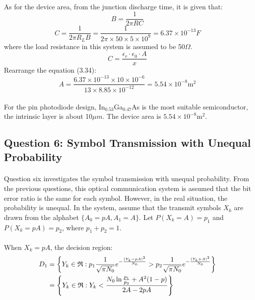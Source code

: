 \documentclass[12pt]{article}
\begin{document}
    \paragraph{}
    As for the device area, from the junction discharge time, it is given that:
    \begin{equation}
         B = \frac{1}{2 \pi R C}
    \end{equation}
    \begin{equation}
         C = \frac{1}{2 \pi R_L B}=\frac{1}{2\pi \times 50 \times 5 \times 10^9} = 6.37 \times10^{-13}F
    \end{equation}
    where the load resistance in this system is assumed to be 50$\Omega$.
    \begin{equation}
        C = \frac{\epsilon_r\cdot \epsilon_0 \cdot A}{x}
    \end{equation}
    Rearrange the equation (3.34):
    \begin{equation}
        A =  \frac{6.37 \times 10^{-13} \times 10 \times 10^{-6}}{13 \times 8.85 \times 10 ^ {-12}} = 5.54 \times 10^{-8}\mbox{m}^2
    \end{equation}
    \paragraph{}
    For the pin photodiode design, In$_{0.53}$Ga$_{0.47}$As is the most suitable semiconductor, the intrinsic layer is about 10$\mu m$. The device area is $5.54 \times 10^{-8}\mbox{m}^2$.
    
    
    
    \subsection{Question 6: Symbol Transmission with Unequal Probability}
    \paragraph{}
    Question six investigates the symbol transmission with unequal probability. From the previous questions, this optical communication system is assumed that the bit error ratio is the same for each symbol. However, in the real situation, the probability is unequal. In the system, assume that the transmit symbols $X_k$ are drawn from the alphabet $\{ A_0 = pA, A_1 = A \}$. Let $P(X_k = A) = p_1$ and $P(X_k = pA) = p_2$, where $p_1+p_2=1$.
    \paragraph{}
    When $X_k = pA$, the decision region:
    \begin{align}
                D_1 &= \left\{ Y_k \in \mathfrak{R}: p_1 \frac{1}{\sqrt{\pi N_0}} e^{-\frac{(Y_k - pA)^2}{N_0}} > p_2 \frac{1}{\sqrt{\pi N_0}} e^{-\frac{(Y_k + A) ^2}{N_0}} \right\} \notag \\
                &= \left\{ Y_k \in \mathfrak{R}: Y_k < \frac{N_0 \ln \frac{p_1}{p_2} + A^2(1 - p)}{2A - 2pA} \right\}
            \end{align}
\end{document}
